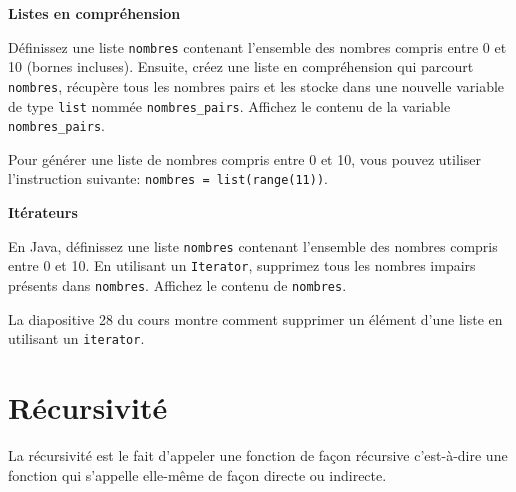 \begin{Exercice}[5 minutes] [Python] \textbf{Listes en compréhension}

    Définissez une liste \lstinline{nombres} contenant l'ensemble des nombres compris entre 0 et 10 (bornes incluses). Ensuite, créez une liste en compréhension qui parcourt \lstinline{nombres}, récupère tous les nombres pairs et les stocke dans une nouvelle variable de type \lstinline{list} nommée \lstinline{nombres_pairs}. Affichez le contenu de la variable \lstinline{nombres_pairs}.

    \begin{conseil}
        Pour générer une liste de nombres compris entre 0 et 10, vous pouvez utiliser l'instruction suivante: \lstinline{nombres = list(range(11))}.
    \end{conseil}

    \begin{solution}
        
    \end{solution}
\end{Exercice}

\begin{Exercice}[10 minutes] [Java] \textbf{Itérateurs}

    En Java, définissez une liste \lstinline{nombres} contenant l'ensemble des nombres compris entre 0 et 10. 
    En utilisant un \lstinline{Iterator}, supprimez tous les nombres impairs présents dans \lstinline{nombres}.
    Affichez le contenu de \lstinline{nombres}.

    \begin{conseil}
        La diapositive 28 du cours montre comment supprimer un élément d'une liste en utilisant un \lstinline{iterator}.
    \end{conseil}

    \begin{solution}
        
    \end{solution}
\end{Exercice}

     \section{Récursivité}
    
    La récursivité est le fait d'appeler une fonction de façon récursive c'est-à-dire une fonction qui s'appelle elle-même de façon directe ou indirecte. \\\\
    
